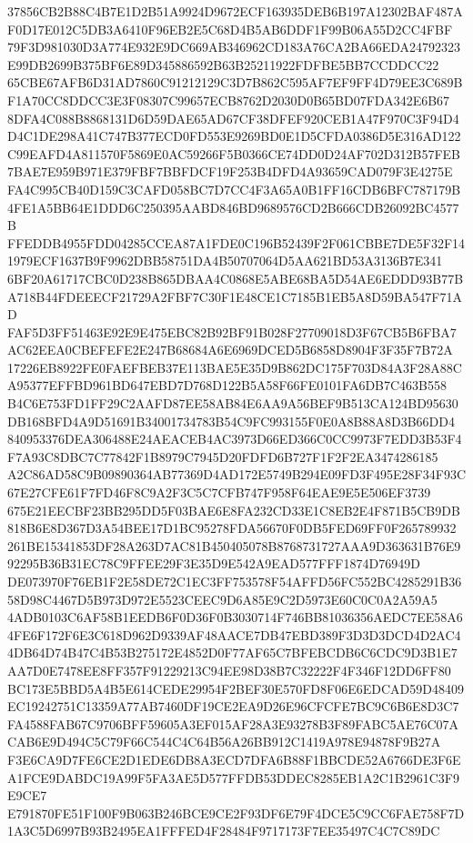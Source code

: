 \documentclass[UTF8,fontset=fandol,zihao=-4,a4paper]{ctexart}
\begin{document}
{{37856CB2B88C4B7E1D2B51A9924D9672ECF163935DEB6B197A12302BAF487AF0D17E012C5DB3A6410F96EB2E5C68D4B5AB6DDF1F99B06A55D2CC4FBF
79F3D981030D3A774E932E9DC669AB346962CD183A76CA2BA66EDA24792323E99DB2699B375BF6E89D345886592B63B25211922FDFBE5BB7CCDDCC22
65CBE67AFB6D31AD7860C91212129C3D7B862C595AF7EF9FF4D79EE3C689BF1A70CC8DDCC3E3F08307C99657ECB8762D2030D0B65BD07FDA342E6B67
8DFA4C088B8868131D6D59DAE65AD67CF38DFEF920CEB1A47F970C3F94D4D4C1DE298A41C747B377ECD0FD553E9269BD0E1D5CFDA0386D5E316AD122
C99EAFD4A811570F5869E0AC59266F5B0366CE74DD0D24AF702D312B57FEB7BAE7E959B971E379FBF7BBFDCF19F253B4DFD4A93659CAD079F3E4275E
FA4C995CB40D159C3CAFD058BC7D7CC4F3A65A0B1FF16CDB6BFC787179B4FE1A5BB64E1DDD6C250395AABD846BD9689576CD2B666CDB26092BC4577B
FFEDDB4955FDD04285CCEA87A1FDE0C196B52439F2F061CBBE7DE5F32F141979ECF1637B9F9962DBB58751DA4B50707064D5AA621BD53A3136B7E341
6BF20A61717CBC0D238B865DBAA4C0868E5ABE68BA5D54AE6EDDD93B77BA718B44FDEEECF21729A2FBF7C30F1E48CE1C7185B1EB5A8D59BA547F71AD
FAF5D3FF51463E92E9E475EBC82B92BF91B028F27709018D3F67CB5B6FBA7AC62EEA0CBEFEFE2E247B68684A6E6969DCED5B6858D8904F3F35F7B72A
17226EB8922FE0FAEFBEB37E113BAE5E35D9B862DC175F703D84A3F28A88CA95377EFFBD961BD647EBD7D768D122B5A58F66FE0101FA6DB7C463B558
B4C6E753FD1FF29C2AAFD87EE58AB84E6AA9A56BEF9B513CA124BD95630DB168BFD4A9D51691B34001734783B54C9FC993155F0E0A8B88A8D3B66DD4
840953376DEA306488E24AEACEB4AC3973D66ED366C0CC9973F7EDD3B53F4F7A93C8DBC7C77842F1B8979C7945D20FDFD6B727F1F2F2EA3474286185
A2C86AD58C9B09890364AB77369D4AD172E5749B294E09FD3F495E28F34F93C67E27CFE61F7FD46F8C9A2F3C5C7CFB747F958F64EAE9E5E506EF3739
675E21EECBF23BB295DD5F03BAE6E8FA232CD33E1C8EB2E4F871B5CB9DB818B6E8D367D3A54BEE17D1BC95278FDA56670F0DB5FED69FF0F265789932
261BE15341853DF28A263D7AC81B450405078B8768731727AAA9D363631B76E992295B36B31EC78C9FFEE29F3E35D9E542A9EAD577FFF1874D76949D
DE073970F76EB1F2E58DE72C1EC3FF753578F54AFFD56FC552BC4285291B3658D98C4467D5B973D972E5523CEEC9D6A85E9C2D5973E60C0C0A2A59A5
4ADB0103C6AF58B1EEDB6F0D36F0B3030714F746BB81036356AEDC7EE58A64FE6F172F6E3C618D962D9339AF48AACE7DB47EBD389F3D3D3DCD4D2AC4
4DB64D74B47C4B53B275172E4852D0F77AF65C7BFEBCDB6C6CDC9D3B1E7AA7D0E7478EE8FF357F91229213C94EE98D38B7C32222F4F346F12DD6FF80
BC173E5BBD5A4B5E614CEDE29954F2BEF30E570FD8F06E6EDCAD59D48409EC19242751C13359A77AB7460DF19CE2EA9D26E96CFCFE7BC9C6B6E8D3C7
FA4588FAB67C9706BFF59605A3EF015AF28A3E93278B3F89FABC5AE76C07ACAB6E9D494C5C79F66C544C4C64B56A26BB912C1419A978E94878F9B27A
F3E6CA9D7FE6CE2D1EDE6DB8A3ECD7DFA6B88F1BBCDE52A6766DE3F6EA1FCE9DABDC19A99F5FA3AE5D577FFDB53DDEC8285EB1A2C1B2961C3F9E9CE7
E791870FE51F100F9B063B246BCE9CE2F93DF6E79F4DCE5C9CC6FAE758F7D1A3C5D6997B93B2495EA1FFFED4F28484F9717173F7EE35497C4C7C89DC
}}
\end{document}
